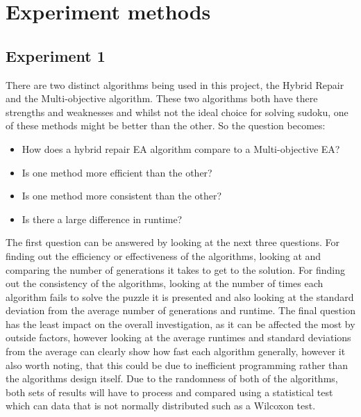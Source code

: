 \documentclass[a4paper,11pt]{article}
\begin{document}
\section{Experiment methods}

\subsection{Experiment 1}
There are two distinct algorithms being used in this project, the Hybrid Repair and the Multi-objective algorithm. These two algorithms both have there strengths and weaknesses and whilst not the ideal choice for solving sudoku, one of these methods might be better than the other. So the question becomes: 
\begin{itemize} 
	\item How does a hybrid repair EA algorithm compare to a Multi-objective EA? 
	\item Is one method more efficient than the other?
	\item Is one method more consistent than the other?
	\item Is there a large difference in runtime?
\end{itemize}
The first question can be answered by looking at the next three questions. For finding out the efficiency or effectiveness of the algorithms, looking at and comparing the number of generations it takes to get to the solution.  For finding out the consistency of the algorithms, looking at the number of times each algorithm fails to solve the puzzle it is presented and also looking at the standard deviation from the average number of generations and runtime. \newline \newline The final question has the least impact on the overall investigation, as it can be affected the most by outside factors, however looking at the average runtimes and standard deviations from the average can clearly show how fast each algorithm generally, however it also worth noting, that this could be due to inefficient programming rather than the algorithms design itself. Due to the randomness of both of the algorithms, both sets of results will have to process and compared using a statistical test which can data that is not normally distributed such as a Wilcoxon test.
\end{document}
